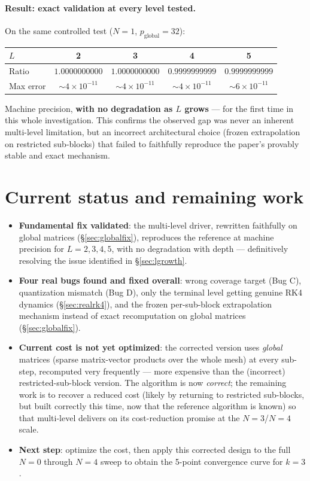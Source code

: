 \documentclass[11pt]{article}
\begin{document}
\paragraph{Result: exact validation at every level tested.} On the
same controlled test ($N=1$, $p_{\text{global}}=32$):
\begin{center}
\begin{tabular}{@{}lcccc@{}}
\toprule
$L$ & 2 & 3 & 4 & 5 \\
\midrule
Ratio & $1.0000000000$ & $1.0000000000$ & $0.9999999999$ & $0.9999999999$ \\
Max error & $\sim 4\times10^{-11}$ & $\sim 4\times10^{-11}$ & $\sim 4\times10^{-11}$ & $\sim 6\times10^{-11}$ \\
\bottomrule
\end{tabular}
\end{center}
Machine precision, \textbf{with no degradation as $L$ grows} --- for
the first time in this whole investigation. This confirms the observed
gap was never an inherent multi-level limitation, but an incorrect
architectural choice (frozen extrapolation on restricted sub-blocks)
that failed to faithfully reproduce the paper's provably stable and
exact mechanism.

\section{Current status and remaining work}

\begin{itemize}
  \item \textbf{Fundamental fix validated}: the multi-level driver,
  rewritten faithfully on global matrices (\S\ref{sec:globalfix}),
  reproduces the reference at machine precision for $L=2,3,4,5$, with
  no degradation with depth --- definitively resolving the issue
  identified in \S\ref{sec:lgrowth}.
  \item \textbf{Four real bugs found and fixed overall}: wrong coverage
  target (Bug C), quantization mismatch (Bug D), only the terminal
  level getting genuine RK4 dynamics (\S\ref{sec:realrk4}), and the
  frozen per-sub-block extrapolation mechanism instead of exact
  recomputation on global matrices (\S\ref{sec:globalfix}).
  \item \textbf{Current cost is not yet optimized}: the corrected
  version uses \emph{global} matrices (sparse matrix-vector products
  over the whole mesh) at every sub-step, recomputed very frequently
  --- more expensive than the (incorrect) restricted-sub-block version.
  The algorithm is now \emph{correct}; the remaining work is to recover
  a reduced cost (likely by returning to restricted sub-blocks, but
  built correctly this time, now that the reference algorithm is
  known) so that multi-level delivers on its cost-reduction promise at
  the $N=3$/$N=4$ scale.
  \item \textbf{Next step}: optimize the cost, then apply this
  corrected design to the full $N=0$ through $N=4$ sweep to obtain the
  5-point convergence curve for $k=3$.
\end{itemize}
\end{document}
